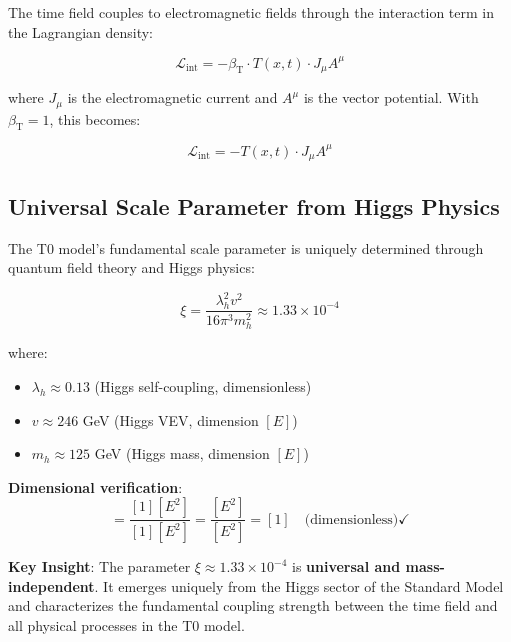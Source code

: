 \documentclass[12pt,a4paper]{article}
\newcommand{\Tfieldt}{T(x,t)}
\newcommand{\betaT}{\beta_{\text{T}}}
\newcommand{\xipar}{\xi}
\begin{document}
	The time field couples to electromagnetic fields through the interaction term in the Lagrangian density:
	
	\begin{equation}
		\mathcal{L}_{\text{int}} = -\betaT \cdot \Tfieldt \cdot J_{\mu} A^{\mu}
	\end{equation}
	
	where $J_{\mu}$ is the electromagnetic current and $A^{\mu}$ is the vector potential. With $\betaT = 1$, this becomes:
	
	\begin{equation}
		\mathcal{L}_{\text{int}} = -\Tfieldt \cdot J_{\mu} A^{\mu}
	\end{equation}
	
	\subsection{Universal Scale Parameter from Higgs Physics}
	\label{subsec:universal_scale_parameter}
	
	The T0 model's fundamental scale parameter is uniquely determined through quantum field theory and Higgs physics:
	
	\begin{equation}
		\boxed{\xipar = \frac{\lambda_h^2 v^2}{16\pi^3 m_h^2} \approx 1.33 \times 10^{-4}}
		\label{eq:xi_higgs_universal}
	\end{equation}
	
	where:
	\begin{itemize}
		\item $\lambda_h \approx 0.13$ (Higgs self-coupling, dimensionless)
		\item $v \approx 246$ GeV (Higgs VEV, dimension $[E]$)
		\item $m_h \approx 125$ GeV (Higgs mass, dimension $[E]$)
	\end{itemize}
	
	\textbf{Dimensional verification}:
	\begin{equation}
		[\xipar] = \frac{[1][E^2]}{[1][E^2]} = \frac{[E^2]}{[E^2]} = [1] \quad \text{(dimensionless)} \checkmark
	\end{equation}
	
	\begin{tcolorbox}[colback=green!5!white,colframe=green!75!black,title=Universal Scale Parameter]
		\textbf{Key Insight}: The parameter $\xipar \approx 1.33 \times 10^{-4}$ is \textbf{universal and mass-independent}. It emerges uniquely from the Higgs sector of the Standard Model and characterizes the fundamental coupling strength between the time field and all physical processes in the T0 model.
	\end{tcolorbox}
	
\end{document}
